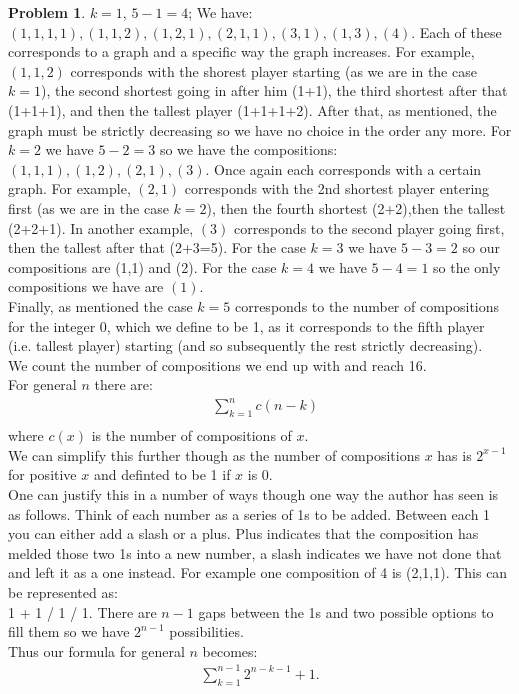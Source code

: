 \documentclass{article}
\theoremstyle{definition}
\newtheorem{problem}{Problem}
\begin{document}
\begin{problem}
$k=1$, $5-1=4$; We have: $(1,1,1,1), (1,1,2), (1,2,1), (2,1,1), (3,1), (1,3), (4)$. Each of these corresponds to a graph and a specific way the graph increases. For example, $(1,1,2)$ corresponds with the shorest player starting (as we are in the case $k=1$), the second shortest
going in after him (1+1), the third shortest after that (1+1+1), and then the tallest player (1+1+1+2). After that, as mentioned, the graph must be strictly decreasing so we have no choice in the order any more. For $k=2$ we have $5-2=3$ so we have the compositions:
$(1,1,1), (1,2), (2,1), (3)$. Once again each corresponds with a certain graph. For example, $(2,1)$ corresponds with the 2nd shortest player entering first (as we are in the case $k=2$), then the fourth shortest (2+2),then the tallest (2+2+1). In another example, $(3)$ corresponds to the second player going first, then
the tallest after that (2+3=5). For the case $k=3$ we have $5-3=2$ so our compositions are (1,1) and (2). For the case $k=4$ we have $5-4=1$ so the only compositions we have are $(1)$.\\

Finally, as mentioned the case $k=5$ corresponds to the number of compositions for the integer 0, which we define to be 1, as it corresponds to the fifth player (i.e. tallest player) starting (and so subsequently the rest strictly decreasing).\\

We count the number of compositions we end up with and reach 16.\\

For general $n$ there are:
\begin{align*}
    &\sum_{k=1}^n c(n-k)\\
\end{align*}
where $c(x)$ is the number of compositions of $x$.\\

We can simplify this further though as the number of compositions $x$ has is $2^{x-1}$ for positive $x$ and definted to be 1 if $x$ is 0.\\

One can justify this in a number of ways though one way the author has seen is as follows. Think of each number as a series of 1s to be added.
Between each 1 you can either add a slash or a plus. Plus indicates that the composition has melded those two 1s into a new number, a slash indicates we have not done that and left it as a one instead.
For example one composition of 4 is (2,1,1). This can be represented as:\\
1 + 1 / 1 / 1. There are $n-1$ gaps between the 1s and two possible options to fill them so we have $2^{n-1}$ possibilities.\\

Thus our formula for general $n$ becomes:
\begin{align*}
    \sum_{k=1}^{n-1}2^{n-k-1} + 1.
\end{align*}

\end{problem}
\end{document}
